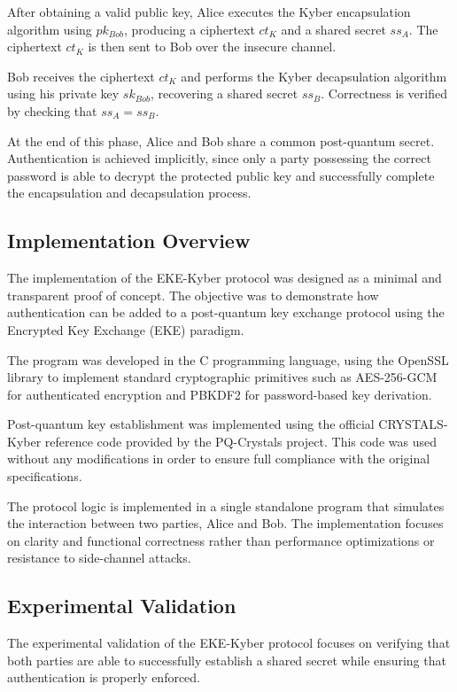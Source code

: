 \documentclass[12pt]{article}
\begin{document}
After obtaining a valid public key, Alice executes the Kyber encapsulation algorithm using \(pk_{Bob}\), producing a ciphertext \(ct_{K}\) and a shared secret \(ss_A\). The ciphertext \(ct_{K}\) is then sent to Bob over the insecure channel.

Bob receives the ciphertext \(ct_{K}\) and performs the Kyber decapsulation algorithm using his private key \(sk_{Bob}\), recovering a shared secret \(ss_B\). Correctness is verified by checking that \(ss_A = ss_B\).

At the end of this phase, Alice and Bob share a common post-quantum secret. Authentication is achieved implicitly, since only a party possessing the correct password is able to decrypt the protected public key and successfully complete the encapsulation and decapsulation process.


\subsection{Implementation Overview}

The implementation of the EKE-Kyber protocol was designed as a minimal and transparent proof of concept. The objective was to demonstrate how authentication can be added to a post-quantum key exchange protocol using the Encrypted Key Exchange (EKE) paradigm.

The program was developed in the C programming language, using the OpenSSL library to implement standard cryptographic primitives such as AES-256-GCM for authenticated encryption and PBKDF2 for password-based key derivation.

Post-quantum key establishment was implemented using the official CRYSTALS-Kyber reference code provided by the PQ-Crystals project. This code was used without any modifications in order to ensure full compliance with the original specifications.

The protocol logic is implemented in a single standalone program that simulates the interaction between two parties, Alice and Bob. The implementation focuses on clarity and functional correctness rather than performance optimizations or resistance to side-channel attacks.

\subsection{Experimental Validation}

The experimental validation of the EKE-Kyber protocol focuses on verifying that both parties are able to successfully establish a shared secret while ensuring that authentication is properly enforced. 
\end{document}
